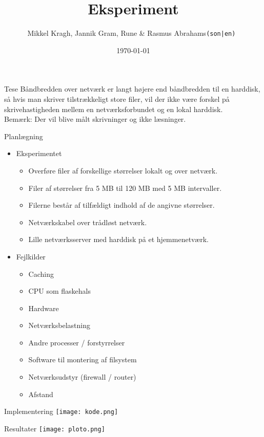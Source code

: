 \documentclass{beamer}
\title[Eksperiment]{Eksperiment}
\author{Mikkel Kragh, Jannik Gram, Rune \& Rasmus Abrahams{\tt (son|en) }}
\institute{DIKU}
\date{\today}
\begin{document}
\begin{frame}
\titlepage
\end{frame}


\begin{frame}{Tese}
Båndbredden over netværk er langt højere end båndbredden til en harddisk, så hvis man skriver tilstrækkeligt store filer, vil der ikke være forskel på skrivehastigheden mellem en netværksforbundet og en lokal harddisk.\\
$$ $$
Bemærk: Der vil blive målt skrivninger og ikke læsninger.
\end{frame}


\begin{frame}{Planlægning}
\begin{itemize}
\item Eksperimentet
\begin{itemize}
\item Overføre filer af forskellige størrelser lokalt og over netværk.
\item Filer af størrelser fra 5 MB til 120 MB med 5 MB intervaller.
\item Filerne består af tilfældigt indhold af de angivne størrelser.
\item Netværkskabel over trådløst netværk.
\item Lille netværksserver med harddisk på et hjemmenetværk.
\end{itemize}
\item Fejlkilder
\begin{itemize}
\item Caching
\item CPU som flaskehals
\item Hardware
\item Netværksbelastning
\item Andre processer / forstyrrelser
\item Software til montering af filsystem
\item Netværksudstyr (firewall / router)
\item Afstand
\end{itemize}
\end{itemize}
\end{frame}


\begin{frame}{Implementering}
\texttt{[image: kode.png]}
\end{frame}


\begin{frame}{Resultater}
\texttt{[image: ploto.png]}
\end{frame}
\end{document}
